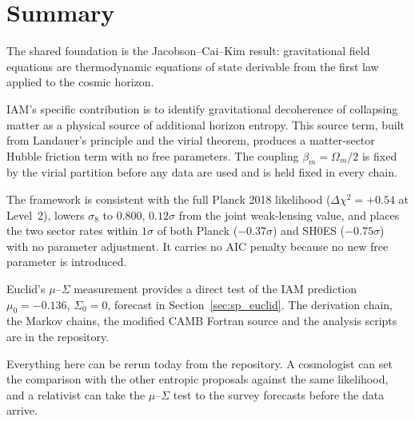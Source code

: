 \section{Summary}\label{sec:eg_summary}
The shared foundation is the Jacobson--Cai--Kim result: gravitational field equations are thermodynamic equations of state derivable from the first law
applied to the cosmic horizon.

IAM's specific contribution is to identify gravitational decoherence of collapsing matter as a physical source of additional horizon entropy. This source
term, built from Landauer's principle and the virial theorem, produces a matter-sector Hubble friction term with no free parameters. The coupling
$\beta_m=\Omega_m/2$ is fixed by the virial partition before any data are used and is held fixed in every chain.

The framework is consistent with the full Planck 2018 likelihood ($\Delta\chi^2=+0.54$ at Level~2), lowers $\sigma_8$ to $0.800$, $0.12\sigma$ from the joint
weak-lensing value, and places the two sector rates within $1\sigma$ of both Planck ($-0.37\sigma$) and SH0ES ($-0.75\sigma$) with no parameter
adjustment. It carries no AIC penalty because no new free parameter is introduced.

Euclid's $\mu$--$\Sigma$ measurement provides a direct test of the IAM prediction $\mu_0=-0.136$, $\Sigma_0=0$, forecast in
Section~\ref{sec:sp_euclid}. The derivation chain, the Markov chains, the modified CAMB Fortran source and the analysis scripts are in the repository.

Everything here can be rerun today from the repository. A cosmologist can set the comparison with the other entropic proposals against the same likelihood, and a relativist can take the $\mu$--$\Sigma$ test to the survey forecasts before the data arrive.

